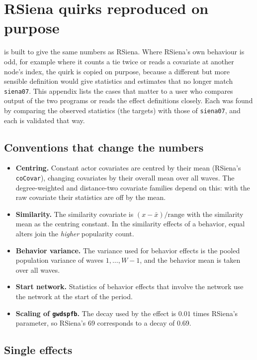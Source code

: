 \chapter{RSiena quirks reproduced on purpose}\label{app:quirks}

\nwsaom{} is built to give the same numbers as RSiena. Where RSiena's own
behaviour is odd, for example where it counts a tie twice or reads a covariate
at another node's index, the quirk is copied on purpose, because a different but
more sensible definition would give statistics and estimates that no longer
match \texttt{siena07}. This appendix lists the cases that matter to a user who
compares output of the two programs or reads the effect definitions closely.
Each was found by comparing the observed statistics (the targets) with those of
\texttt{siena07}, and each is validated that way.

\section*{Conventions that change the numbers}

\begin{itemize}
\item \textbf{Centring.} Constant actor covariates are centred by their mean
  (RSiena's \texttt{coCovar}), changing covariates by their overall mean over
  all waves. The degree-weighted and distance-two covariate families depend on
  this: with the raw covariate their statistics are off by the mean.
\item \textbf{Similarity.} The similarity covariate is
  $(x-\bar x)/\text{range}$ with the similarity mean as the centring constant.
  In the similarity effects of a behavior, equal alters join the \emph{higher}
  popularity count.
\item \textbf{Behavior variance.} The variance used for behavior effects is the
  pooled population variance of waves $1,\dots,W-1$, and the behavior mean is
  taken over all waves.
\item \textbf{Start network.} Statistics of behavior effects that involve the
  network use the network at the start of the period.
\item \textbf{Scaling of \texttt{gwdspfb}.} The decay used by the effect is
  $0.01$ times RSiena's parameter, so RSiena's 69 corresponds to a decay
  of 0.69.
\end{itemize}

\section*{Single effects}

